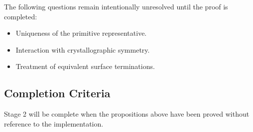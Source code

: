 The following questions remain intentionally unresolved until the proof
is completed:

\begin{itemize}
\item Uniqueness of the primitive representative.
\item Interaction with crystallographic symmetry.
\item Treatment of equivalent surface terminations.
\end{itemize}

\subsection{Completion Criteria}

Stage 2 will be complete when the propositions above have been proved
without reference to the implementation.
